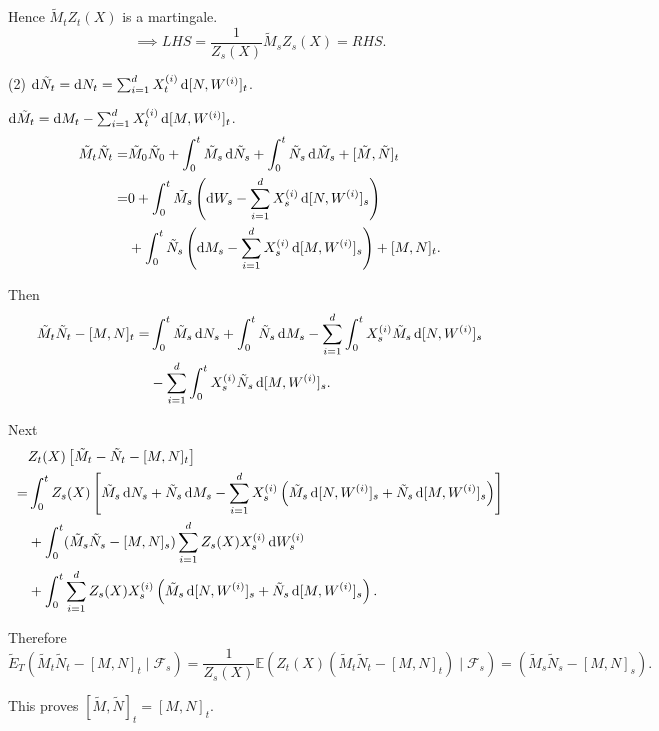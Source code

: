 {    Hence $\tilde{M}_t Z_t(X)$ is a martingale.
    $$
    \implies LHS = \frac{1}{Z_s(X)}\tilde{M}_s Z_s(X) = RHS.
    $$
    
    (2) $\mathop{}\!\mathrm{d} \tilde{N}_t = \mathop{}\!\mathrm{d} N_t = \sum_{i=1}^d X_t^{(i)} \mathop{}\!\mathrm{d} [N,W^{(i)}]_t$.
    
    $\mathop{}\!\mathrm{d} \tilde{M}_t = \mathop{}\!\mathrm{d} M_t - \sum_{i=1}^d X_t^{(i)} \mathop{}\!\mathrm{d} [M,W^{(i)}]_t$.
    $$
    \begin{aligned}
    \tilde{M}_t \tilde{N}_t =& \tilde{M}_0 \tilde{N}_0 + \int_0^t \tilde{M}_s \mathop{}\!\mathrm{d} \tilde{N}_s + \int_0^t \tilde{N}_s \mathop{}\!\mathrm{d} \tilde{M}_s + [\tilde{M},\tilde{N}]_t\\
    =&0 + \int_0^t \tilde{M}_s \left( \mathop{}\!\mathrm{d} W_s -\sum_{i=1}^d X_s^{(i)} \mathop{}\!\mathrm{d} [N,W^{(i)}]_s \right)\\
    &+\int_0^t \tilde{N}_s \left( \mathop{}\!\mathrm{d} M_s - \sum_{i=1}^d X_s^{(i)}\mathop{}\!\mathrm{d} [M,W^{(i)}]_s \right) + [M,N]_t.    \end{aligned}
    $$

    Then 
    $$
    \begin{aligned}
        \tilde{M}_t \tilde{N}_t - [M,N]_t =& \int_0^t \tilde{M}_s \mathop{}\!\mathrm{d} N_s + \int_0^t \tilde{N}_s \mathop{}\!\mathrm{d} M_s - \sum_{i=1}^d \int_0^t X_s^{(i)}  \tilde{M}_s \mathop{}\!\mathrm{d} [N,W^{(i)}]_s \\
        &- \sum_{i=1}^d \int_0^t X_s^{(i)}\tilde{N}_s \mathop{}\!\mathrm{d} [M,W^{(i)}]_s.
    \end{aligned}
    $$

    Next 
    $$
    \begin{aligned}
        &Z_t(X) \left[ \tilde{M}_t - \tilde{N}_t - [M,N]_t \right]\\
        =&\int_0^t Z_s(X)\left[ \tilde{M}_s \mathop{}\!\mathrm{d} N_s + \tilde{N}_s \mathop{}\!\mathrm{d} M_s - \sum_{i=1}^d X_s^{(i)}\left( \tilde{M}_s \mathop{}\!\mathrm{d} [N,W^{(i)}]_s +\tilde{N}_s \mathop{}\!\mathrm{d} [M,W^{(i)}]_s \right) \right]\\
        &+ \int_0^t (\tilde{M}_s \tilde{N}_s - [M,N]_s)\sum_{i=1}^d Z_s(X) X_s^{(i)}\mathop{}\!\mathrm{d} W_s^{(i)}\\
        &+ \int_0^t \sum_{i=1}^d Z_s(X) X_s^{(i)}\left( \tilde{M}_s \mathop{}\!\mathrm{d} [N,W^{(i)}]_s + \tilde{N}_s \mathop{}\!\mathrm{d} [M,W^{(i)}]_s \right).
    \end{aligned}
    $$

    Therefore 
    $$
    \tilde{E}_T(\tilde{M}_t \tilde{N}_t - [M,N]_t \mid \mathcal{F}_s) = \frac{1}{Z_s(X)}\mathbb{E}(Z_t(X)(\tilde{M}_t \tilde{N}_t - [M,N]_t) \mid \mathcal{F}_s) = (\tilde{M}_s \tilde{N}_s - [M,N]_s).
    $$

    This proves $[\tilde{M},\tilde{N}]_t = [M,N]_t$.
}

